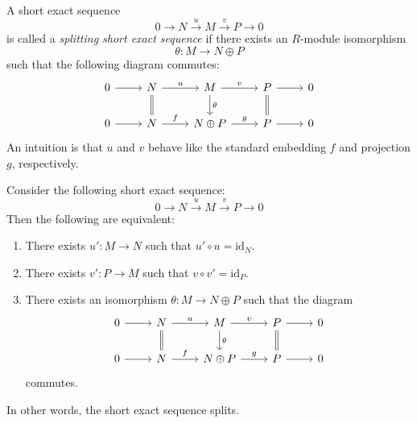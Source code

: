 \begin{definition}[Definition 2.18]
    A short exact sequence
    \[
        0 \longrightarrow N \xrightarrow{u} M \xrightarrow{v} P \longrightarrow 0
    \]
    is called a \emph{splitting short exact sequence} if there exists an $R$-module isomorphism
    \[
        \theta : M \to N \oplus P
    \]
    such that the following diagram commutes:
    \[
        \begin{tikzcd}
            0 \arrow[r] & N \arrow[r, "u"] \arrow[d, equal]
            & M \arrow[r, "v"] \arrow[d, "\theta"]
            & P \arrow[r] \arrow[d, equal] & 0 \\
            0 \arrow[r] & N \arrow[r, "f"]
            & N \oplus P \arrow[r, "g"]
            & P \arrow[r] & 0
        \end{tikzcd}
    \]
    An intuition is that $u$ and $v$ behave like the standard embedding $f$ and projection $g$, respectively.
\end{definition}

\begin{theorem}[Theorem 2.9]
    Consider the following short exact sequence:
    \[
        0 \longrightarrow N \xrightarrow{u} M \xrightarrow{v} P \longrightarrow 0
    \]
    Then the following are equivalent:
    \begin{enumerate}
        \item There exists $u' : M \to N$ such that $u' \circ u = \mathrm{id}_N$.
        \item There exists $v' : P \to M$ such that $v \circ v' = \mathrm{id}_P$.
        \item There exists an isomorphism $\theta : M \to N \oplus P$ such that the diagram
              \[
                  \begin{tikzcd}
                      0 \arrow[r] & N \arrow[r, "u"] \arrow[d, equal]
                      & M \arrow[r, "v"] \arrow[d, "\theta"]
                      & P \arrow[r] \arrow[d, equal] & 0 \\
                      0 \arrow[r] & N \arrow[r, "f"]
                      & N \oplus P \arrow[r, "g"]
                      & P \arrow[r] & 0
                  \end{tikzcd}
              \]
              commutes.
    \end{enumerate}
    In other words, the short exact sequence splits.
\end{theorem}

